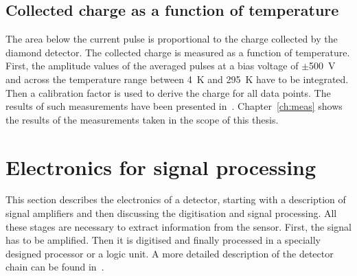 \subsection{Collected charge as a function of temperature}
\label{subsec:qvst}
The area below the current pulse is proportional to the charge collected by the diamond detector. The collected charge is measured as a function of temperature. First, the amplitude values of the averaged pulses at a bias voltage of $\pm$500~V and across the temperature range between 4~K and 295~K have to be integrated. Then a calibration factor is used to derive the charge for all data points. The results of such measurements have been presented in~\cite{Jansen:1956431}. Chapter~\ref{ch:meas} shows the results of the measurements taken in the scope of this thesis.







\section{Electronics for signal processing} %
\label{sec:elecsigproc}
This section describes the electronics of a detector, starting with a description of signal amplifiers and then discussing the digitisation and signal processing. All these stages are necessary to extract information from the sensor. First, the signal has to be amplified. Then it is digitised and finally processed in a specially designed processor or a logic unit. A more detailed description of the detector chain can be found in~\cite{1369574}.

